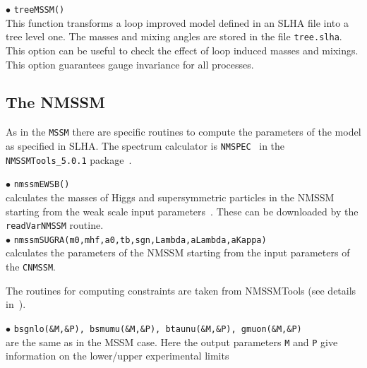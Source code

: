 \documentclass[12pt,a4paper]{article}
\begin{document}


\noi $\bullet$ \verb|treeMSSM()|\\
This function transforms a loop improved model defined in an SLHA file  into a tree level one. The masses and mixing angles are stored in the file
 {\tt tree.slha}. This option can be useful to check the effect of loop induced
masses and mixings. This option  guarantees gauge invariance for all processes.  


\subsection{The NMSSM}

As in the {\tt MSSM} there are specific routines to compute the  
parameters of the model as  specified in SLHA. The spectrum calculator is \verb|NMSPEC|~\cite{Ellwanger:2006rn}
 in the \verb|NMSSMTools_5.0.1| package~\cite{nmssmtools}.

\noindent$\bullet$ \verb|nmssmEWSB()|\\
calculates the masses of Higgs and supersymmetric particles in the NMSSM
starting from the weak scale input parameters~\cite{Ellwanger:2005dv}. These  can be downloaded by the 
{\tt readVarNMSSM} routine.\\   
\noindent$\bullet$ \verb|nmssmSUGRA(m0,mhf,a0,tb,sgn,Lambda,aLambda,aKappa)|\\
calculates the parameters of the NMSSM starting from the input parameters of 
the \verb|CNMSSM|.

The routines for computing constraints are taken from NMSSMTools (see details  in~\cite{Belanger:2006is}).

\noindent
$\bullet$ {\tt bsgnlo(\&M,\&P), bsmumu(\&M,\&P), btaunu(\&M,\&P),  gmuon(\&M,\&P)}\\ 
are the same as in the MSSM case.  Here the output parameters {\tt M} and {\tt P} 
give information on the lower/upper experimental limits~\cite{Domingo:2007dx}
\end{document}
